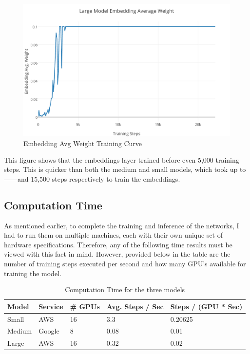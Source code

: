 \documentclass[pageno]{jpaper}
\begin{document}
\begin{figure}[H]
	\centering
	\includegraphics[scale=0.85]{Embedding_Avg_Weight.pdf}
	\caption{Embedding Avg Weight Training Curve}
	\label{fg:embed_avg}
\end{figure}

This figure shows that the embeddings layer trained before even 5,000 training steps.  This is quicker than both the medium and small models, which took up to------and 15,500 steps respectively to train the embeddings.

\subsection{Computation Time}
As mentioned earlier, to complete the training and inference of the networks, I had to run them on multiple machines, each with their own unique set of hardware specifications.  Therefore, any of the following time results must be viewed with this fact in mind.  However, provided below in the table are the number of training steps executed per second and how many GPU's available for training the model.

\begin{table}[H]
	\centering
	\caption{Computation Time for the three models}
	\label{tb:comp_time}
	\begin{tabular}{|l|l|l|l|l|}
		\hline
		\textbf{Model}  & \textbf{Service} & \textbf{\# GPUs} & \textbf{Avg. Steps / Sec} & \textbf{Steps / (GPU * Sec)} \\ \hline
		Small  & AWS     & 16      & 3.3              & 0.20625             \\ \hline
		Medium & Google  & 8       & 0.08             & 0.01                \\ \hline
		Large  & AWS     & 16      & 0.32             & 0.02                \\ \hline
	\end{tabular}
\end{table}
\end{document}

